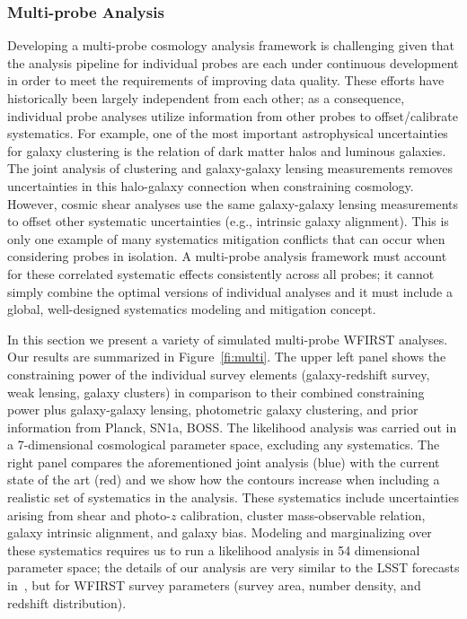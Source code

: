 \subsubsection{\CoLi Multi-probe Analysis} Developing a multi-probe cosmology analysis framework is challenging given that the analysis pipeline for individual probes are each under continuous
development in order to meet the requirements of improving data quality. These
efforts have historically been largely independent from each other; as a
consequence, individual probe analyses utilize information from other probes to
offset/calibrate systematics. For example, one of the most important
astrophysical uncertainties for galaxy clustering is the relation of dark matter
halos and luminous galaxies. The joint analysis of clustering and galaxy-galaxy
lensing measurements removes uncertainties in this halo-galaxy connection when
constraining cosmology. However, cosmic shear analyses use the same
galaxy-galaxy lensing measurements to offset other systematic uncertainties
(e.g., intrinsic galaxy alignment). This is only one example of many systematics
mitigation conflicts that can occur when considering probes in isolation. A
multi-probe analysis framework must account for these correlated systematic
effects consistently across all probes; it cannot simply combine the optimal
versions of individual analyses and it must include a global, well-designed
systematics modeling and mitigation concept.

In this section we present a variety of simulated multi-probe WFIRST analyses.
Our results are summarized in Figure~\ref{fi:multi}. The upper left panel shows
the constraining power of the individual survey elements (galaxy-redshift
survey, weak lensing, galaxy clusters) in comparison to their combined
constraining power plus galaxy-galaxy lensing, photometric galaxy clustering,
and prior information from Planck, SN1a, BOSS\@. The likelihood analysis was
carried out in a 7-dimensional cosmological parameter space, excluding any
systematics. The right panel compares the aforementioned joint analysis (blue)
with the current state of the art (red) and we show how the contours increase
when including a realistic set of systematics in the analysis. These systematics
include uncertainties arising from shear and photo-$z$ calibration, cluster
mass-observable relation, galaxy intrinsic alignment, and galaxy bias. Modeling
and marginalizing over these systematics requires us to run a likelihood
analysis in 54 dimensional parameter space; the details of our analysis are very
similar to the LSST forecasts in~\citet{Krause2017}, but for WFIRST survey
parameters (survey area, number density, and redshift distribution).

